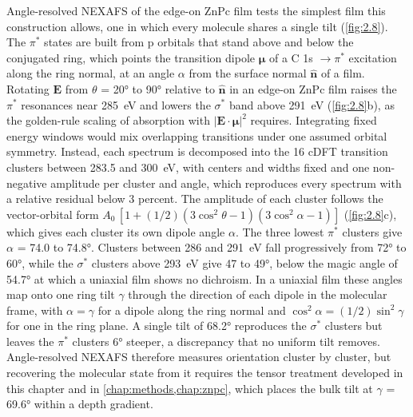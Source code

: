 Angle-resolved NEXAFS of the edge-on ZnPc film tests the simplest film this construction allows, one in which every molecule shares a single tilt (\cref{fig:2.8})\autocite{stohrNEXAFSSpectroscopy1992,adeNEXAFSMicroscopyResonant2008}. The \(\pi^{*}\) states are built from p orbitals that stand above and below the conjugated ring, which points the transition dipole \(\mathbf{\mu}\) of a C 1s \(\rightarrow \pi^{*}\) excitation along the ring normal, at an angle \(\alpha\) from the surface normal \(\widehat{\mathbf{n}}\) of a film. Rotating \(\mathbf{E}\) from \(\theta\) = \ang{20} to \ang{90} relative to \(\widehat{\mathbf{n}}\) in an edge-on ZnPc film raises the \(\pi^{*}\) resonances near \qty{285}{eV} and lowers the \(\sigma^{*}\) band above \qty{291}{eV} (\cref{fig:2.8}b), as the golden-rule scaling of absorption with \(\left| \mathbf{E} \cdot \mathbf{\mu} \right|^{2}\) requires. Integrating fixed energy windows would mix overlapping transitions under one assumed orbital symmetry. Instead, each spectrum is decomposed into the 16 cDFT transition clusters between 283.5 and \qty{300}{eV}, with centers and widths fixed and one non-negative amplitude per cluster and angle, which reproduces every spectrum with a relative residual below 3 percent. The amplitude of each cluster follows the vector-orbital form \(A_{0}\,[1 + (1/2)(3\cos^{2}\theta - 1)(3\cos^{2}\alpha - 1)]\) (\cref{fig:2.8}c), which gives each cluster its own dipole angle \(\alpha\). The three lowest \(\pi^{*}\) clusters give \(\alpha\) = 74.0 to \ang{74.8}. Clusters between 286 and \qty{291}{eV} fall progressively from \ang{72} to \ang{60}, while the \(\sigma^{*}\) clusters above \qty{293}{eV} give 47 to \ang{49}, below the magic angle of \ang{54.7} at which a uniaxial film shows no dichroism. In a uniaxial film these angles map onto one ring tilt \(\gamma\) through the direction of each dipole in the molecular frame, with \(\alpha = \gamma\) for a dipole along the ring normal and \(\cos^{2}\alpha = (1/2)\sin^{2}\gamma\) for one in the ring plane. A single tilt of \ang{68.2} reproduces the \(\sigma^{*}\) clusters but leaves the \(\pi^{*}\) clusters \ang{6} steeper, a discrepancy that no uniform tilt removes. Angle-resolved NEXAFS therefore measures orientation cluster by cluster, but recovering the molecular state from it requires the tensor treatment developed in this chapter and in \cref{chap:methods,chap:znpc}, which places the bulk tilt at \(\gamma\) = \ang{69.6} within a depth gradient.

